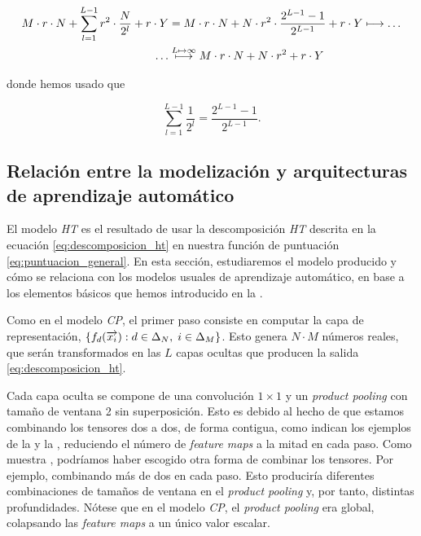 \begin{equation}
	\begin{split}
		M \cdot r \cdot N + \sum_{l = 1}^{L-1} r^2 \cdot \frac{N}{2^l} + r \cdot Y &= M \cdot r \cdot N + N \cdot r^2 \cdot \frac{2^{L-1} - 1}{2^{L-1}} + r \cdot Y \longmapsto \ldots \\
		\ldots & \stackrel{L \mapsto \infty}{\longmapsto} M \cdot r \cdot N + N \cdot r^2 + r \cdot Y
	\end{split}
\end{equation}

donde hemos usado que

\begin{equation}
	\sum_{l = 1}^{L-1} \frac{1}{2^l} = \frac{2^{L-1} - 1}{2^{L-1}}.
\end{equation}

\subsection{Relación entre la modelización y arquitecturas de aprendizaje automático}

El modelo \textit{HT} es el resultado de usar la descomposición \textit{HT} descrita en la ecuación \eqref{eq:descomposicion_ht} en nuestra función de puntuación \eqref{eq:puntuacion_general}. En esta sección, estudiaremos el modelo producido y cómo se relaciona con los modelos usuales de aprendizaje automático, en base a los elementos básicos que hemos introducido en la .

Como en el modelo \textit{CP}, el primer paso consiste en computar la capa de representación, $\{f_d(\overrightarrow{x_i}): d \in \Delta_{N}, \; i \in \Delta_{M}\}$. Esto genera $N \cdot M$ números reales, que serán transformados en las $L$ capas ocultas que producen la salida \eqref{eq:descomposicion_ht}.

Cada capa oculta se compone de una convolución $1 \times 1$ y un \textit{product pooling} con tamaño de ventana 2 sin superposición.  Esto es debido al hecho de que estamos combinando los tensores dos a dos, de forma contigua, como indican los ejemplos de la  y la , reduciendo el número de \textit{feature maps} a la mitad en cada paso. Como muestra \cite{matematicas:descomposicion_ht}, podríamos haber escogido otra forma de combinar los tensores. Por ejemplo, combinando más de dos en cada paso. Esto produciría diferentes combinaciones de tamaños de ventana en el \textit{product pooling} y, por tanto, distintas profundidades. Nótese que en el modelo \textit{CP}, el \textit{product pooling} era global, colapsando las \textit{feature maps} a un único valor escalar.

